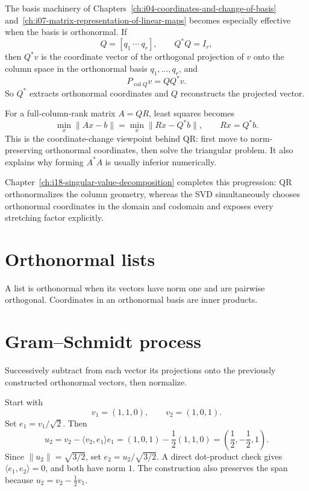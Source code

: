 \begin{remark}
The basis machinery of Chapters~\ref{ch:i04-coordinates-and-change-of-basis}
and~\ref{ch:i07-matrix-representation-of-linear-maps} becomes especially
effective when the basis is orthonormal.  If
\[
Q=[q_1\ \cdots\ q_r],\qquad Q^*Q=I_r,
\]
then \(Q^*v\) is the coordinate vector of the orthogonal projection of \(v\)
onto the column space in the orthonormal basis \(q_1,\ldots,q_r\), and
\[
P_{\operatorname{col}Q}v=QQ^*v.
\]
So \(Q^*\) extracts orthonormal coordinates and \(Q\) reconstructs the
projected vector.

For a full-column-rank matrix \(A=QR\), least squares becomes
\[
\min_x\|Ax-b\|
=
\min_x\|Rx-Q^*b\|,
\qquad
Rx=Q^*b.
\]
This is the coordinate-change viewpoint behind QR: first move to
norm-preserving orthonormal coordinates, then solve the triangular problem.
It also explains why forming \(A^*A\) is usually inferior numerically.

Chapter~\ref{ch:i18-singular-value-decomposition} completes this progression:
QR orthonormalizes the column geometry, whereas the SVD simultaneously chooses
orthonormal coordinates in the domain and codomain and exposes every stretching
factor explicitly.
\end{remark}

\section{Orthonormal lists}
A list is orthonormal when its vectors have norm one and are pairwise orthogonal. Coordinates in an orthonormal basis are inner products.

\section{Gram–Schmidt process}
Successively subtract from each vector its projections onto the previously constructed orthonormal vectors, then normalize.


\begin{example}\label{ex:i14-expand-01}
Start with
\[
v_1=(1,1,0),\qquad v_2=(1,0,1).
\]
Set \(e_1=v_1/\sqrt2\). Then
\[
u_2=v_2-\langle v_2,e_1\rangle e_1
=(1,0,1)-\frac12(1,1,0)
=\left(\frac12,-\frac12,1\right).
\]
Since \(\|u_2\|=\sqrt{3/2}\), set \(e_2=u_2/\sqrt{3/2}\).
A direct dot-product check gives \(\langle e_1,e_2\rangle=0\), and both have
norm \(1\). The construction also preserves the span because
\(u_2=v_2-\frac12v_1\).
\end{example}
